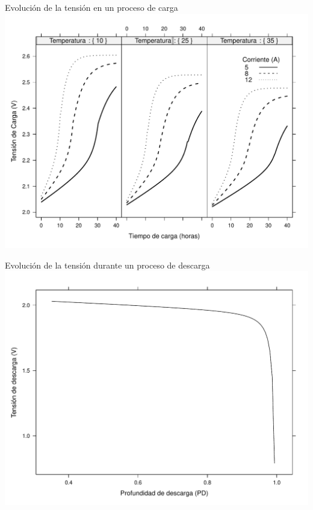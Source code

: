 \documentclass[xcolor={usenames,svgnames,dvipsnames}]{beamer}
\begin{document}
\begin{frame}[label=sec-2-2-4]{Evolución de la tensión en un proceso de carga}
\includegraphics[width=.9\linewidth]{../figs/Bateria_CorrYTemp.pdf}
\end{frame}

\begin{frame}[label=sec-2-2-5]{Evolución de la tensión durante un proceso de descarga}
\includegraphics[width=.9\linewidth]{../figs/Bateria_SOCyDescarga.pdf}
\end{frame}
\end{document}

